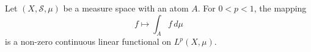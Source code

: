 Let $(X, \mathcal{S}, \mu)$ be a measure space with an atom $A$. For $0 < p < 1$, the mapping
$$
f \mapsto \int_A f \, d\mu
$$
is a non-zero continuous linear functional on $L^p(X, \mu)$.
